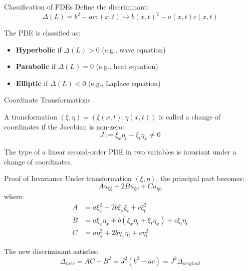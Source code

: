 \documentclass{beamer}
\begin{document}
\begin{frame}{Classification of PDEs}
    Define the discriminant:
    \[
    \Delta(L) = b^2 - ac : (x,t) \mapsto b(x,t)^2 - a(x,t)c(x,t)
    \]
    
    The PDE is classified as:
    \begin{itemize}
        \item \textbf{Hyperbolic} if $\Delta(L) > 0$ (e.g., wave equation)
        \item \textbf{Parabolic} if $\Delta(L) = 0$ (e.g., heat equation)
        \item \textbf{Elliptic} if $\Delta(L) < 0$ (e.g., Laplace equation)
    \end{itemize}
\end{frame}

\begin{frame}{Coordinate Transformations}
    \begin{definition}
        A transformation $(\xi, \eta) = (\xi(x,t), \eta(x,t))$ is called a change of coordinates if the Jacobian is non-zero:
        \[
        J := \xi_x \eta_t - \xi_t \eta_x \neq 0
        \]
    \end{definition}
    
    \begin{theorem}
        The type of a linear second-order PDE in two variables is invariant under a change of coordinates.
    \end{theorem}
\end{frame}

\begin{frame}{Proof of Invariance}
    Under transformation $(\xi, \eta)$, the principal part becomes:
    \[
    A u_{\xi\xi} + 2B u_{\xi\eta} + C u_{\eta\eta}
    \]
    where:
    \[
    \begin{aligned}
        A &= a \xi_x^2 + 2b \xi_x \xi_t + c \xi_t^2 \\
        B &= a \xi_x \eta_x + b (\xi_x \eta_t + \xi_t \eta_x) + c \xi_t \eta_t \\
        C &= a \eta_x^2 + 2b \eta_x \eta_t + c \eta_t^2
    \end{aligned}
    \]
    
    The new discriminant satisfies:
    \[
    \Delta_{new} = AC - B^2 = J^2 (b^2 - ac) = J^2 \Delta_{original}
    \]
\end{frame}
\end{document}
